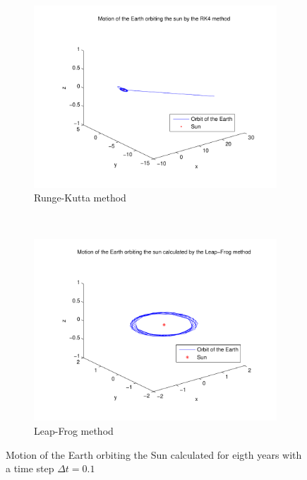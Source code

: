 \documentclass[a4paper,12pt, english]{article}
\begin{document}
	
\begin{figure}
        \centering
        \begin{subfigure}[b]{0.8\textwidth}
                \includegraphics[width=\textwidth]{RK4_n_80_t_8.pdf}
                \caption{Runge-Kutta method}
                \label{fig:RK4_dt_0.1}
        \end{subfigure}%
        ~ %
        \begin{subfigure}[b]{0.8\textwidth}
                \includegraphics[width=\textwidth]{LF_n_80_t_8.pdf}
                \caption{Leap-Frog method}
                \label{fig:LF_dt_0.1}
        \end{subfigure}
        \caption{Motion of the Earth orbiting the Sun calculated for eigth years with a time step $\Delta t = 0.1$}
    
\end{figure}
\end{document}
